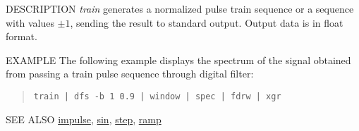 \begin{synopsis}
\item[train] [ --l $L$ ] [ --p $P$ ]
\end{synopsis}

\begin{qsection}{DESCRIPTION}
{\em train} generates a normalized pulse train sequence 
or a sequence with values $\pm 1$, 
sending the result to standard output.
Output data is in float format.
\end{qsection}

\begin{options}
\end{options}

\begin{qsection}{EXAMPLE}
The following example displays the spectrum of
the signal obtained from passing a train pulse sequence through
digital filter:
\begin{quote}
\verb!train | dfs -b 1 0.9 | window | spec | fdrw | xgr!
\end{quote}
\end{qsection}

\begin{qsection}{SEE ALSO}
\hyperlink{impulse}{impulse},
\hyperlink{sin}{sin},
\hyperlink{step}{step},
\hyperlink{ramp}{ramp}
\end{qsection}


